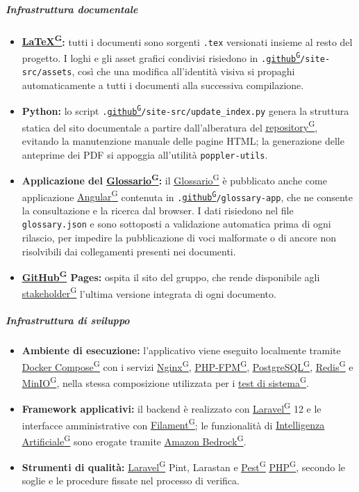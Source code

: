 \documentclass[a4paper,12pt]{article}
\providecommand{\glslink}[2]{\href{https://alittlebyte-19.github.io/Documentazione/glossario.html\#gls-#1}{\underline{#2}\textsuperscript{\scriptsize G}}}
\begin{document}
\subparagraph{Infrastruttura documentale}
\begin{itemize}
    \item \textbf{\glslink{latex}{LaTeX}:} tutti i documenti sono sorgenti \texttt{.tex} versionati insieme al resto del progetto. I loghi e gli asset grafici condivisi risiedono in \texttt{.\glslink{github}{github}/site-src/assets}, così che una modifica all'identità visiva si propaghi automaticamente a tutti i documenti alla successiva compilazione.
    \item \textbf{Python:} lo script \texttt{.\glslink{github}{github}/site-src/update\_index.py} genera la struttura statica del sito documentale a partire dall'alberatura del \glslink{repository}{repository}, evitando la manutenzione manuale delle pagine HTML; la generazione delle anteprime dei PDF si appoggia all'utilità \texttt{poppler-utils}.
    \item \textbf{Applicazione del \glslink{glossario}{Glossario}:} il \glslink{glossario}{Glossario} è pubblicato anche come applicazione \glslink{angular}{Angular} contenuta in \texttt{.\glslink{github}{github}/glossary-app}, che ne consente la consultazione e la ricerca dal browser. I dati risiedono nel file \texttt{glossary.json} e sono sottoposti a validazione automatica prima di ogni rilascio, per impedire la pubblicazione di voci malformate o di ancore non risolvibili dai collegamenti presenti nei documenti.
    \item \textbf{\glslink{github}{GitHub} Pages:} ospita il sito del gruppo, che rende disponibile agli \glslink{stakeholder}{stakeholder} l'ultima versione integrata di ogni documento.
\end{itemize}

\subparagraph{Infrastruttura di sviluppo}
\begin{itemize}
    \item \textbf{Ambiente di esecuzione:} l'applicativo viene eseguito localmente tramite \glslink{docker-compose}{Docker Compose} con i servizi \glslink{nginx}{Nginx}, \glslink{php-fpm}{PHP-FPM}, \glslink{postgresql}{PostgreSQL}, \glslink{redis}{Redis} e \glslink{minio}{MinIO}, nella stessa composizione utilizzata per i \glslink{test-di-sistema}{test di sistema}.
    \item \textbf{Framework applicativi:} il backend è realizzato con \glslink{laravel}{Laravel} 12 e le interfacce amministrative con \glslink{filament}{Filament}; le funzionalità di \glslink{intelligenza-artificiale-ai}{Intelligenza Artificiale} sono erogate tramite \glslink{amazon-bedrock}{Amazon Bedrock}.
    \item \textbf{Strumenti di qualità:} \glslink{laravel}{Laravel} Pint, Larastan e \glslink{pest}{Pest} \glslink{php}{PHP}, secondo le soglie e le procedure fissate nel processo di verifica.
\end{itemize}
\end{document}
